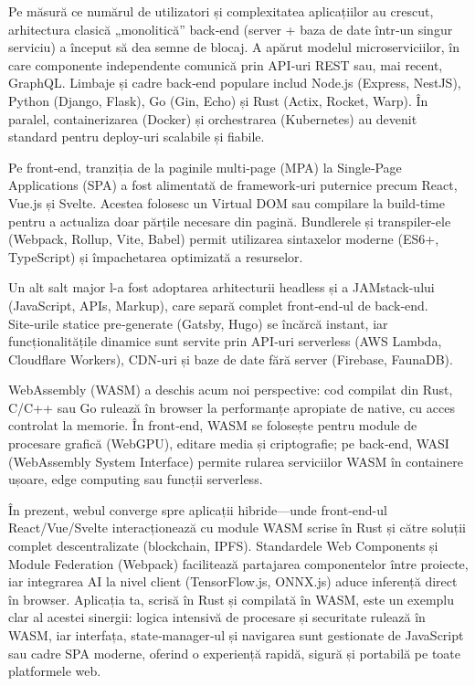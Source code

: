 \documentclass[titlepage,12pt]{article}
\begin{document}
Pe măsură ce numărul de utilizatori și complexitatea aplicațiilor au crescut, arhitectura clasică „monolitică” back‑end (server + baza de date într‑un singur serviciu) a început să dea semne de blocaj. A apărut modelul microserviciilor, în care componente independente comunică prin API‑uri REST sau, mai recent, GraphQL. Limbaje și cadre back‑end populare includ Node.js (Express, NestJS), Python (Django, Flask), Go (Gin, Echo) și Rust (Actix, Rocket, Warp). În paralel, containerizarea (Docker) și orchestrarea (Kubernetes) au devenit standard pentru deploy-uri scalabile și fiabile.

Pe front‑end, tranziția de la paginile multi‑page (MPA) la Single‑Page Applications (SPA) a fost alimentată de framework‑uri puternice precum React, Vue.js și Svelte. Acestea folosesc un Virtual DOM sau compilare la build‑time pentru a actualiza doar părțile necesare din pagină. Bundlerele și transpiler-ele (Webpack, Rollup, Vite, Babel) permit utilizarea sintaxelor moderne (ES6+, TypeScript) și împachetarea optimizată a resurselor.

Un alt salt major l-a fost adoptarea arhitecturii headless și a JAMstack-ului (JavaScript, APIs, Markup), care separă complet front‑end‑ul de back‑end. Site‑urile statice pre‑generate (Gatsby, Hugo) se încărcă instant, iar funcționalitățile dinamice sunt servite prin API‑uri serverless (AWS Lambda, Cloudflare Workers), CDN-uri și baze de date fără server (Firebase, FaunaDB).

WebAssembly (WASM) a deschis acum noi perspective: cod compilat din Rust, C/C++ sau Go rulează în browser la performanțe apropiate de native, cu acces controlat la memorie. În front‑end, WASM se folosește pentru module de procesare grafică (WebGPU), editare media și criptografie; pe back‑end, WASI (WebAssembly System Interface) permite rularea serviciilor WASM în containere ușoare, edge computing sau funcții serverless.

În prezent, webul converge spre aplicații hibride—unde front‑end-ul React/Vue/Svelte interacționează cu module WASM scrise în Rust și către soluții complet descentralizate (blockchain, IPFS). Standardele Web Components și Module Federation (Webpack) facilitează partajarea componentelor între proiecte, iar integrarea AI la nivel client (TensorFlow.js, ONNX.js) aduce inferență direct în browser. Aplicația ta, scrisă în Rust și compilată în WASM, este un exemplu clar al acestei sinergii: logica intensivă de procesare și securitate rulează în WASM, iar interfața, state‑manager‑ul și navigarea sunt gestionate de JavaScript sau cadre SPA moderne, oferind o experiență rapidă, sigură și portabilă pe toate platformele web.
\end{document}

